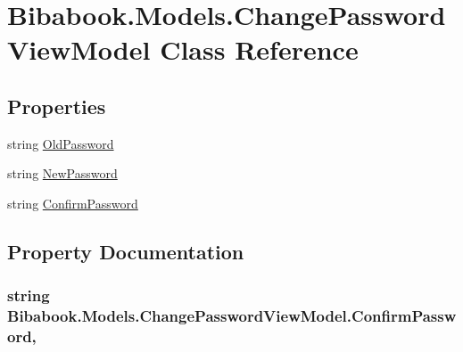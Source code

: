 \hypertarget{class_bibabook_1_1_models_1_1_change_password_view_model}{}\section{Bibabook.\+Models.\+Change\+Password\+View\+Model Class Reference}
\label{class_bibabook_1_1_models_1_1_change_password_view_model}
\subsection*{Properties}
\begin{DoxyCompactItemize}
\item 
string \hyperlink{class_bibabook_1_1_models_1_1_change_password_view_model_a7c87bffbff147ae4a1cb1fec49e06df0}{Old\+Password}
\item 
string \hyperlink{class_bibabook_1_1_models_1_1_change_password_view_model_a80c1b15314d22670823a098f7cbba735}{New\+Password}
\item 
string \hyperlink{class_bibabook_1_1_models_1_1_change_password_view_model_a842daef420476565379b6dc82bbeac5a}{Confirm\+Password}
\end{DoxyCompactItemize}


\subsection{Property Documentation}
\hypertarget{class_bibabook_1_1_models_1_1_change_password_view_model_a842daef420476565379b6dc82bbeac5a}{}
\subsubsection[{Confirm\+Password}]{\setlength{\rightskip}{0pt plus 5cm}string Bibabook.\+Models.\+Change\+Password\+View\+Model.\+Confirm\+Password\hspace{0.3cm}{\ttfamily [get]}, {\ttfamily [set]}}\label{class_bibabook_1_1_models_1_1_change_password_view_model_a842daef420476565379b6dc82bbeac5a}
\hypertarget{class_bibabook_1_1_models_1_1_change_password_view_model_a80c1b15314d22670823a098f7cbba735}{}
